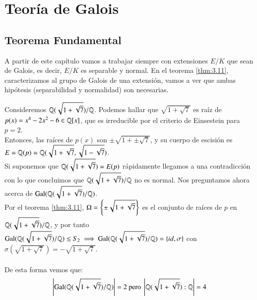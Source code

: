 
\chapter{Teoría de Galois}

\section{Teorema Fundamental} %

A partir de este capítulo vamos a trabajar siempre con extensiones $E/K$ que sean de Galois, es decir, $E/K$ es separable y normal. En el teorema \ref{thm:3.11}, caracterizamos al grupo de Galois de una extensión, vamos a ver que ambas hipótesis (separabilidad y normalidad) son necesarias.

\begin{eg}
    Consideremos $\mathbb{Q}(\sqrt{1 + \sqrt 7})/\mathbb{Q}$. Podemos hallar que $\sqrt{1 + \sqrt 7}$ es raíz de $p(x) = x^4-2x^2-6 \in \mathbb{Q}[x]$, que es irreducible por el criterio de Einsestein para $p=2$.\\
    Entonces, las raíces de $p(x)$ son $\pm\sqrt{1 + \pm\sqrt 7}$, y su cuerpo de escisión es $E = \mathbb{Q}(p) = \mathbb{Q}(\sqrt{1 + \sqrt 7}, \sqrt{1 - \sqrt 7})$.\\
    Si suponemos que $\mathbb{Q}(\sqrt{1 + \sqrt 7}) = E(p)$ rápidamente llegamos a una contradicción con lo que concluimos que $\mathbb{Q}(\sqrt{1 + \sqrt 7})/\mathbb{Q}$ no es normal. Nos  preguntamos ahora acerca de $\mathrm{Gal}(\mathbb{Q}(\sqrt{1 + \sqrt 7})/\mathbb{Q})$.\\
    Por el teorema \ref{thm:3.11}, $\Omega = \left\{\pm \sqrt{1 + \sqrt 7}\right\}$ es el conjunto de raíces de $p$ en $\mathbb{Q}(\sqrt{1 + \sqrt 7})/\mathbb{Q}$, y por tanto $\mathrm{Gal}(\mathbb{Q}(\sqrt{1 + \sqrt 7})/\mathbb{Q}) \leq S_2 \implies \mathrm{Gal}(\mathbb{Q}(\sqrt{1 + \sqrt 7})/\mathbb{Q}) = \left\{id, \sigma\right\}$ con $\sigma(\sqrt{1 + \sqrt 7}) = -\sqrt{1 + \sqrt 7}$.\\\\
    De esta forma vemos que:
    $$
        \left|\mathrm{Gal}(\mathbb{Q}(\sqrt{1 + \sqrt 7})/\mathbb{Q})\right| = 2 \text{ pero } \left|\mathbb{Q}(\sqrt{1 + \sqrt 7}):\mathbb{Q}\right| = 4
    $$
\end{eg}

